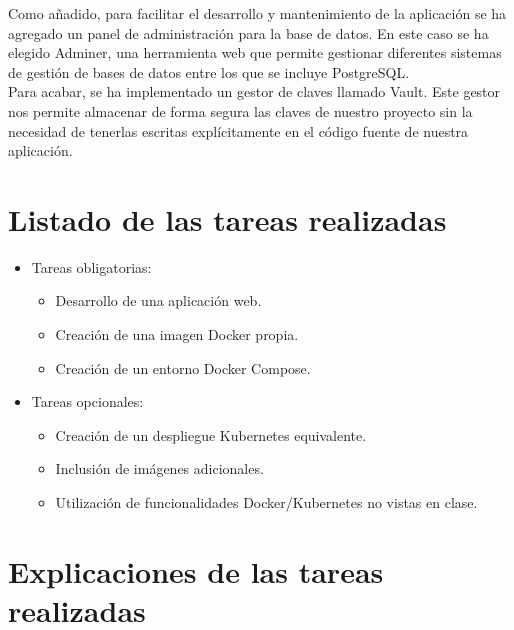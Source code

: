 \documentclass{report}
\begin{document}
        Como añadido, para facilitar el desarrollo y mantenimiento de la aplicación se ha agregado un panel de administración para la base de datos.
        En este caso se ha elegido Adminer, una herramienta web que permite gestionar diferentes sistemas de gestión de bases de datos entre los que se incluye PostgreSQL.\\

        Para acabar, se ha implementado un gestor de claves llamado Vault. Este gestor nos permite almacenar de forma segura las claves de nuestro proyecto sin la necesidad de tenerlas escritas explícitamente en el código fuente de nuestra aplicación.\\
    \chapter{Listado de las tareas realizadas}
        \begin{itemize}
            \item Tareas obligatorias:
            \begin{itemize}
                \item Desarrollo de una aplicación web. \checkmark
                \item Creación de una imagen Docker propia. \checkmark
                \item Creación de un entorno Docker Compose. \checkmark
            \end{itemize}
            \item Tareas opcionales:
            \begin{itemize}
                \item Creación de un despliegue Kubernetes equivalente. \checkmark
                \item Inclusión de imágenes adicionales. \checkmark
                \item Utilización de funcionalidades Docker/Kubernetes no vistas en clase. \checkmark
            \end{itemize}
        \end{itemize}
    \chapter{Explicaciones de las tareas realizadas}
\end{document}
